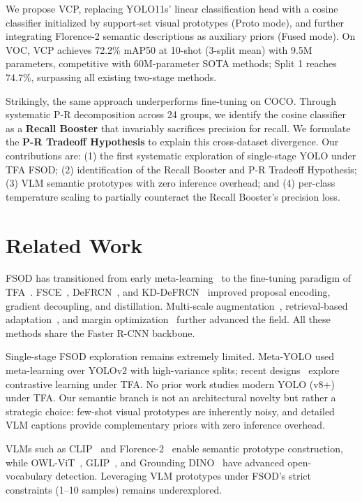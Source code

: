 \documentclass[conference]{IEEEtran}
\begin{document}
We propose VCP, replacing YOLO11s' linear classification head with a cosine classifier initialized by support-set visual prototypes (Proto mode), and further integrating Florence-2 semantic descriptions as auxiliary priors (Fused mode). On VOC, VCP achieves 72.2\% mAP50 at 10-shot (3-split mean) with 9.5M parameters, competitive with 60M-parameter SOTA methods; Split 1 reaches 74.7\%, surpassing all existing two-stage methods.

Strikingly, the same approach underperforms fine-tuning on COCO. Through systematic P-R decomposition across 24 groups, we identify the cosine classifier as a \textbf{Recall Booster} that invariably sacrifices precision for recall. We formulate the \textbf{P-R Tradeoff Hypothesis} to explain this cross-dataset divergence. Our contributions are: (1) the first systematic exploration of single-stage YOLO under TFA FSOD; (2) identification of the Recall Booster and P-R Tradeoff Hypothesis; (3) VLM semantic prototypes with zero inference overhead; and (4) per-class temperature scaling to partially counteract the Recall Booster's precision loss.

\section{Related Work}

FSOD has transitioned from early meta-learning~\cite{huang2025prototype,gao2025decoupling} to the fine-tuning paradigm of TFA~\cite{wang2020tfa}. FSCE~\cite{sun2021fsce}, DeFRCN~\cite{qiao2021defrcn}, and KD-DeFRCN~\cite{pei2022kddefrcn} improved proposal encoding, gradient decoupling, and distillation. Multi-scale augmentation~\cite{vu2025multiperspective}, retrieval-based adaptation~\cite{li2025domainrag}, and margin optimization~\cite{li2021cme} further advanced the field. All these methods share the Faster R-CNN backbone.

Single-stage FSOD exploration remains extremely limited. Meta-YOLO used meta-learning over YOLOv2 with high-variance splits; recent designs~\cite{chen2025generalized} explore contrastive learning under TFA. No prior work studies modern YOLO (v8+) under TFA. Our semantic branch is not an architectural novelty but rather a strategic choice: few-shot visual prototypes are inherently noisy, and detailed VLM captions provide complementary priors with zero inference overhead.

VLMs such as CLIP~\cite{radford2021clip} and Florence-2~\cite{xiao2024florence2} enable semantic prototype construction, while OWL-ViT~\cite{minderer2022owlvit}, GLIP~\cite{li2022glip}, and Grounding DINO~\cite{liu2023groundingdino} have advanced open-vocabulary detection. Leveraging VLM prototypes under FSOD's strict constraints (1--10 samples) remains underexplored.
\end{document}
